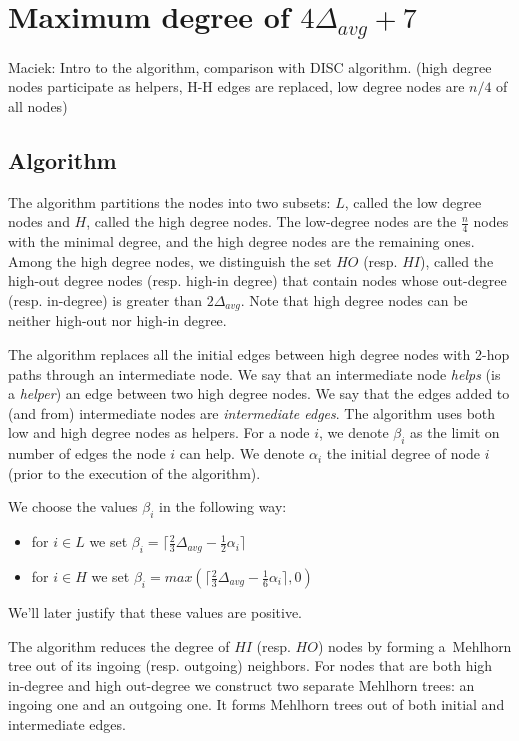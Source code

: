 \documentclass{article}
\begin{document}
\section{Maximum degree of $4\Delta_{avg} + 7$}

Maciek: Intro to the algorithm, comparison with DISC algorithm.
(high degree nodes participate as helpers, H-H edges are replaced, low degree nodes are $n/4$ of all nodes)

\subsection{Algorithm}

The algorithm partitions the nodes into two subsets: $L$, called the low degree nodes and $H$, called
the high degree nodes. The low-degree nodes are
the $\frac{n}{4}$ nodes with the minimal degree, and the high degree nodes
are the remaining ones.
Among the high degree nodes, we distinguish the set $HO$ (resp. $HI$), called the high-out degree nodes (resp. high-in degree) that contain nodes whose out-degree (resp. in-degree) is greater than
$2\Delta_{avg}$.
Note that high degree nodes can be neither high-out nor high-in degree.

The algorithm replaces all the initial edges between high degree nodes with 2-hop paths through an intermediate node.
We say that an intermediate node \emph{helps} (is a \emph{helper}) an edge between two high degree nodes.
We say that the edges added to (and from) intermediate nodes are \emph{intermediate edges}.
The algorithm uses both low and high degree nodes as helpers.
For a node $i$, we denote $\beta_i$ as the limit on number of edges the node $i$ can help.
We denote $\alpha_i$ the initial degree of node $i$ (prior to the execution of the algorithm).

We choose the values $\beta_i$ in the following way:
\begin{itemize}
  \item for $i \in L$ we set
  $\beta_i = \lceil\frac{2}{3}\Delta_{avg}-\frac{1}{2}\alpha_i\rceil$
  \item for $i \in H$ we set
  $\beta_i = max(\lceil\frac{2}{3}\Delta_{avg}-\frac{1}{6}\alpha_i\rceil, 0)$
\end{itemize}
We'll later justify that these values are positive.

The algorithm reduces the degree of $HI$ (resp. $HO$) nodes by forming a~Mehlhorn tree out of its ingoing (resp. outgoing) neighbors.
For nodes that are both high in-degree and high out-degree we construct two separate Mehlhorn trees: an ingoing one and an outgoing one.
It forms Mehlhorn trees out of both initial and intermediate edges.
\end{document}

